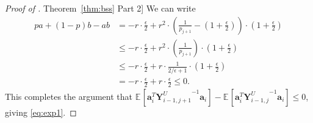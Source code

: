 \documentclass[11pt]{article}
\numberwithin{equation}{section}
\theoremstyle{definition}
\theoremstyle{plain}
\newcommand{\expref}[2]{\hyperref[#2]{#1~\ref{#2}}}
\newcommand{\bv}[1]{\mathbf{#1}}
\newcommand{\expct}[3]{\mathbb{E}_{{#1}_{#2}}\left[#3\right]}
\begin{document}
\begin{proof}[Proof of \expref{Theorem}{thm:bss} Part 2]
We can write %
%
%
%
\begin{align*}
pa + (1-p)b - ab  %
&= -r \cdot \frac{ \epsilon}{2}  + r^2 \cdot \left (\frac{1}{p_{j+1}} - \left (1+\frac{\epsilon}{2}\right)\right )\cdot \left (1+\frac{\epsilon}{2}\right)\\
 & \le  -r \cdot \frac{\epsilon}{2} + r^2 \cdot \left (\frac{1}{p_{j+1}}\right ) \cdot \left (1+\frac{\epsilon}{2}\right)\\
 & \le  -r \cdot \frac{\epsilon}{2} + r \cdot \frac{1}{2/\epsilon+1} \cdot \left (1+\frac{\epsilon}{2}\right)\\
  & =  -r \cdot \frac{\epsilon}{2} + r \cdot \frac{\epsilon}{2} \le 0.
\end{align*}
This completes the argument that $\expct{}{}{\bv{a}_i^T {\bv{Y}^U_{i-1,j+1}}^{-1} \bv{a}_i} - \expct{}{}{\bv{a}_i^T {\bv{Y}^U_{i-1,j}}^{-1}  \bv{a}_i} \le 0$, giving \eqref{eq:exp1}.


\smallskip


\end{proof}
\end{document}
